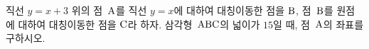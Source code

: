 직선 $y=x+3$ 위의 점~$\mathrm{A}$를 직선 $y=x$에 대하여 대칭이동한 점을 $\mathrm{B}$, 점~$\mathrm{B}$를 원점에 대하여 대칭이동한 점을 $\mathrm{C}$라 하자. 삼각형~$\mathrm{ABC}$의 넓이가 $15$일 때, 점~$\mathrm{A}$의 좌표를 구하시오. 
